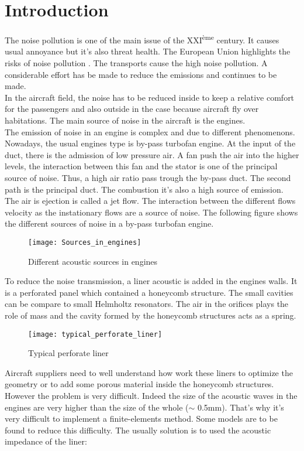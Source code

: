 \section{Introduction}
The noise pollution is one of the main issue of the XXI\textsuperscript{ème} century. It causes usual annoyance but it's also threat health. The European Union highlights the risks of noise pollution \cite{Noise_in_Europe}. The transports cause the high noise pollution.  A considerable effort has be made to reduce the emissions and continues to be made.\\ 
In the aircraft field, the noise has to be reduced inside to keep a relative comfort for the passengers and also outside in the case because aircraft fly over habitations. The main source of noise in the aircraft is the engines.\\
The emission of noise in an engine is complex and due to different phenomenons. Nowadays, the usual engines type is by-pass turbofan engine. At the input of the duct, there is the admission of low pressure air. A fan push the air into the higher levels, the interaction between this fan and the stator is one of the principal source of noise. Thus, a high air ratio pass trough the by-pass duct. The second path is the principal duct. The combustion it's also a high source of emission. The air is ejection is called a jet flow. The interaction between the different flows velocity as the instationary flows are a source of noise. The following figure shows the different sources of noise in a by-pass turbofan engine.
\begin{figure}[H] \centering
    \texttt{[image: Sources\_in\_engines]}
    \caption{Different acoustic sources in engines \cite{Zhou_thesis}}
\end{figure}
To reduce the noise transmission, a liner acoustic is added in the engines walls. It is a perforated panel which contained a honeycomb structure. The small cavities can be compare to small Helmholtz resonators. The air in the orifices plays the role of mass and the cavity formed by the honeycomb structures acts as a spring.
\begin{figure}[H] \centering
\label{fig:Sources_in_engines2}
    \texttt{[image: typical\_perforate\_liner]}
    \caption{Typical perforate liner \cite{The_jet_engine}}
\end{figure}
Aircraft suppliers need to well understand how work these liners to optimize the geometry or to add some porous material inside the honeycomb structures. However the problem is very difficult. Indeed the size of the acoustic waves in the engines are very higher than the size of the whole ($\sim$ 0.5mm). That's why it's very difficult to implement a finite-elements method. Some models are to be found to reduce this difficulty. The usually solution is to used the acoustic impedance of the liner:
